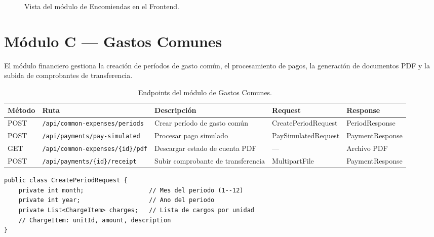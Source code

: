 \begin{figure}[H]
  \centering
  \caption{Vista del módulo de Encomiendas en el Frontend.}
  \label{fig:anexo-encomiendas-frontend}
\end{figure}

\section{Módulo C --- Gastos Comunes}

El módulo financiero gestiona la creación de períodos de gasto común, el procesamiento de pagos, la generación de documentos PDF y la subida de comprobantes de transferencia.

\begin{table}[H]
\centering
\small
\begin{tabular}{|p{}|p{}|p{}|p{}|p{}|}
\hline
\textbf{Método} & \textbf{Ruta} & \textbf{Descripción} & \textbf{Request} & \textbf{Response} \\\hline
POST & \texttt{/api/common-expenses/periods} & Crear período de gasto común & CreatePeriod\-Request & Period\-Response \\\hline
POST & \texttt{/api/payments/pay-simulated} & Procesar pago simulado & PaySimulated\-Request & Payment\-Response \\\hline
GET & \texttt{/api/common-expenses/\{id\}/pdf} & Descargar estado de cuenta PDF & --- & Archivo PDF \\\hline
POST & \texttt{/api/payments/\{id\}/receipt} & Subir comprobante de transferencia & Multipart\-File & Payment\-Response \\\hline
\end{tabular}
\caption{Endpoints del módulo de Gastos Comunes.}
\label{tab:endpoints-gastos}
\end{table}

\begin{lstlisting}[style=javadto, title={\texttt{CreatePeriodRequest}}]
public class CreatePeriodRequest {
    private int month;                  // Mes del periodo (1--12)
    private int year;                   // Ano del periodo
    private List<ChargeItem> charges;   // Lista de cargos por unidad
    // ChargeItem: unitId, amount, description
}
\end{lstlisting}

